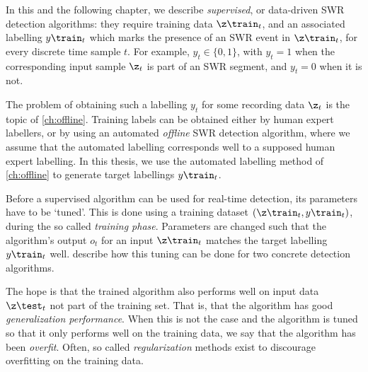 \label{sec:data-driven-algorithms}

In this and the following chapter, we describe \emph{supervised}, or data-driven SWR detection algorithms: they require training data $\z\train_t$, and an associated labelling $y\train_t$ which marks the presence of an SWR event in $\z\train_t$, for every discrete time sample $t$. For example, $y_t \in \{0, 1\}$, with $y_t = 1$ when the corresponding input sample $\z_t$ is part of an SWR segment, and $y_t = 0$ when it is not.

The problem of obtaining such a labelling $y_t$ for some recording data $\z_t$ is the topic of \cref{ch:offline}. Training labels can be obtained either by human expert labellers, or by using an automated \emph{offline} SWR detection algorithm, where we assume that the automated labelling corresponds well to a supposed human expert labelling. In this thesis, we use the automated labelling method of \cref{ch:offline} to generate target labellings $y\train_t$.

Before a supervised algorithm can be used for real-time detection, its parameters have to be `tuned'. This is done using a training dataset $(\z\train_t, y\train_t)$, during the so called \emph{training phase}. Parameters are changed such that the algorithm's output $o_t$ for an input $\z\train_t$ matches the target labelling $y\train_t$ well.  describe how this tuning can be done for two concrete detection algorithms.

The hope is that the trained algorithm also performs well on input data $\z\test_t$ not part of the training set. That is, that the algorithm has good \emph{generalization performance}. When this is not the case and the algorithm is tuned so that it only performs well on the training data, we say that the algorithm has been \emph{overfit}. Often, so called \emph{regularization} methods exist to discourage overfitting on the training data.
